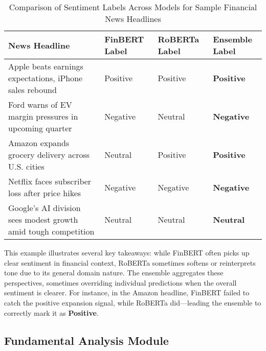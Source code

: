 \documentclass[conference]{IEEEtran}
\begin{document}
\begin{table*}[htbp]
\renewcommand{\arraystretch}{1.3}
\centering
\caption{Comparison of Sentiment Labels Across Models for Sample Financial News Headlines}
\label{tab:sentiment_model_comparison}
\begin{tabular}{|p{8cm}|p{2.5cm}|p{2.5cm}|p{2.5cm}|}
\hline
\textbf{News Headline} & \textbf{FinBERT Label} & \textbf{RoBERTa Label} & \textbf{Ensemble Label} \\
\hline
Apple beats earnings expectations, iPhone sales rebound & Positive & Positive & \textbf{Positive} \\
\hline
Ford warns of EV margin pressures in upcoming quarter & Negative & Neutral & \textbf{Negative} \\
\hline
Amazon expands grocery delivery across U.S. cities & Neutral & Positive & \textbf{Positive} \\
\hline
Netflix faces subscriber loss after price hikes & Negative & Negative & \textbf{Negative} \\
\hline
Google’s AI division sees modest growth amid tough competition & Neutral & Neutral & \textbf{Neutral} \\
\hline
\end{tabular}
\end{table*}


This example illustrates several key takeaways: while FinBERT often picks up clear sentiment in financial context, RoBERTa sometimes softens or reinterprets tone due to its general domain nature. The ensemble aggregates these perspectives, sometimes overriding individual predictions when the overall sentiment is clearer. For instance, in the Amazon headline, FinBERT failed to catch the positive expansion signal, while RoBERTa did—leading the ensemble to correctly mark it as \textbf{Positive}.


\subsection{Fundamental Analysis Module}
\end{document}
